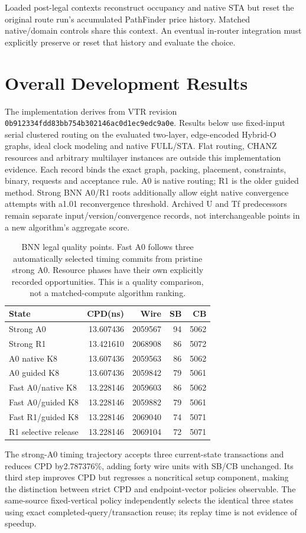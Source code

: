 \documentclass[conference,10pt]{IEEEtran}
\begin{document}
Loaded post-legal contexts reconstruct occupancy and native STA but reset the original route run's accumulated PathFinder price history. Matched native/domain controls share this context. An eventual in-router integration must explicitly preserve or reset that history and evaluate the choice.

\section{Overall Development Results}
The implementation derives from VTR revision \texttt{0b912334fdd83bb754b302146ac0d1ec9edc9a0e}. Results below use fixed-input serial clustered routing on the evaluated two-layer, edge-encoded Hybrid-O graphs, ideal clock modeling and native FULL/STA. Flat routing, CHANZ resources and arbitrary multilayer instances are outside this implementation evidence. Each record binds the exact graph, packing, placement, constraints, binary, requests and acceptance rule. A0 is native routing; R1 is the older guided method. Strong BNN A0/R1 roots additionally allow eight native convergence attempts with a1.01 reconvergence threshold. Archived U and Tf predecessors remain separate input/version/convergence records, not interchangeable points in a new algorithm's aggregate score.

\begin{table}[t]
\centering\caption{BNN legal quality points. Fast A0 follows three automatically selected timing commits from pristine strong A0. Resource phases have their own explicitly recorded opportunities. This is a quality comparison, not a matched-compute algorithm ranking.}
\label{tab:bnn}
\small
\begin{tabular}{lrrrr}\hline
State & CPD(ns) & Wire & SB & CB\\\hline
Strong A0 &13.607436&2059567&94&5062\\
Strong R1 &13.421610&2068908&86&5072\\
A0 native K8 &13.607436&2059563&86&5062\\
A0 guided K8 &13.607436&2059842&79&5061\\
Fast A0/native K8 &13.228146&2059603&86&5062\\
Fast A0/guided K8 &13.228146&2059882&79&5061\\
Fast R1/guided K8 &13.228146&2069040&74&5071\\
R1 selective release &13.228146&2069104&72&5071\\\hline
\end{tabular}
\end{table}
The strong-A0 timing trajectory accepts three current-state transactions and reduces CPD by2.787376\%, adding forty wire units with SB/CB unchanged. Its third step improves CPD but regresses a noncritical setup component, making the distinction between strict CPD and endpoint-vector policies observable. The same-source fixed-vertical policy independently selects the identical three states using exact completed-query/transaction reuse; its replay time is not evidence of speedup.
\end{document}
